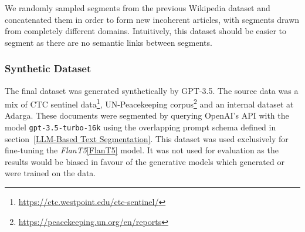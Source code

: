 We randomly sampled segments from the previous Wikipedia dataset and concatenated them in order to form new incoherent articles, with segments drawn from completely different domains. Intuitively, this dataset should be easier to segment as there are no semantic links between segments.

\subsubsection{Synthetic Dataset}

The final dataset was generated synthetically by GPT-3.5. The source data was a mix of CTC sentinel data\footnote{\url{https://ctc.westpoint.edu/ctc-sentinel/}}, UN-Peacekeeping corpus\footnote{\url{https://peacekeeping.un.org/en/reports}} and an internal dataset at Adarga. These documents were segmented by querying OpenAI's API with the model \texttt{gpt-3.5-turbo-16k} using the overlapping prompt schema defined in section~\ref{LLM-Based Text Segmentation}. This dataset was used exclusively for fine-tuning the \emph{FlanT5}\ref{FlanT5} model. It was not used for evaluation as the results would be biased in favour of the generative models which generated or were trained on the data.